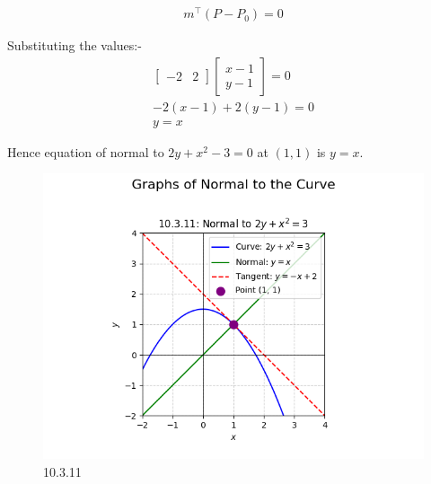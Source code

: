 \documentclass[journal]{IEEEtran}
\begin{document}
\begin{align}
m^\top (P - P_0) = 0
\end{align}

Substituting the values:-
\begin{align}
\begin{bmatrix}-2 & 2\end{bmatrix}\begin{bmatrix}x-1 \\y-1\end{bmatrix}= 0\\
-2(x-1) + 2(y-1) = 0\\
y = x
\end{align}

Hence equation of normal to $2y + x^2 - 3 = 0$ at $(1,1)$ is $y = x$.

\begin{figure}[H]
    \centering
    \includegraphics[width=0.85\columnwidth]{figs/graph-17.png}
    \caption{10.3.11}
    \label{fig:placeholder}
\end{figure}
\end{document}

